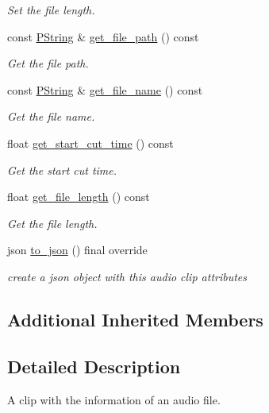 \begin{DoxyCompactItemize}
\begin{DoxyCompactList}\small\item\em Set the file length. \end{DoxyCompactList}\item 
const \mbox{\hyperlink{classprz_1_1_p_string}{P\+String}} \& \mbox{\hyperlink{classprz_1_1_audio___clip_a06d95e1ba1b854e8f00b2ec3602d3c5f}{get\+\_\+file\+\_\+path}} () const
\begin{DoxyCompactList}\small\item\em Get the file path. \end{DoxyCompactList}\item 
const \mbox{\hyperlink{classprz_1_1_p_string}{P\+String}} \& \mbox{\hyperlink{classprz_1_1_audio___clip_a548005698eae9ec6499fe1f02f69ecf1}{get\+\_\+file\+\_\+name}} () const
\begin{DoxyCompactList}\small\item\em Get the file name. \end{DoxyCompactList}\item 
float \mbox{\hyperlink{classprz_1_1_audio___clip_a0000a44ffec1e064301fd93750806aab}{get\+\_\+start\+\_\+cut\+\_\+time}} () const
\begin{DoxyCompactList}\small\item\em Get the start cut time. \end{DoxyCompactList}\item 
float \mbox{\hyperlink{classprz_1_1_audio___clip_aa64143bed59cae5e2809284ad5765b52}{get\+\_\+file\+\_\+length}} () const
\begin{DoxyCompactList}\small\item\em Get the file length. \end{DoxyCompactList}\item 
json \mbox{\hyperlink{classprz_1_1_audio___clip_a15fdef4e8547e25d06785d816be71a12}{to\+\_\+json}} () final override
\begin{DoxyCompactList}\small\item\em create a json object with this audio clip attributes \end{DoxyCompactList}\end{DoxyCompactItemize}
\subsection*{Additional Inherited Members}


\subsection{Detailed Description}
A clip with the information of an audio file. 



